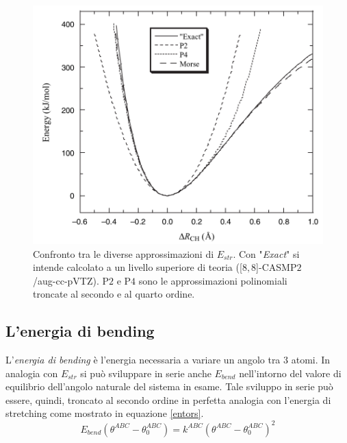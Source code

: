 \documentclass[oneside]{amsbook}
\numberwithin{section}{chapter}
\numberwithin{equation}{section}
\numberwithin{figure}{section}
\begin{document}
\begin{figure} [H]
\label{morsepot}
\centering
\caption{Confronto tra le diverse approssimazioni di $E_{str}$. Con "\emph{Exact}" si intende calcolato a un livello superiore di teoria ([$8,8$]-CASMP$2$/aug-cc-pVTZ). P$2$ e P$4$ sono le approssimazioni polinomiali troncate al secondo e al quarto ordine.}
\includegraphics[scale=0.4]{morsepot}
\end{figure}

\subsection{L'energia di bending }
L'\emph{energia di bending} è l'energia necessaria a variare un angolo tra  $3$ atomi. In analogia con $E_{str}$ si può sviluppare in serie anche $E_{bend}$ nell'intorno del valore di equilibrio dell'angolo naturale del sistema in esame. Tale sviluppo in serie può essere, quindi, troncato al secondo ordine in perfetta analogia con l'energia di stretching come mostrato in equazione \ref{entors}.
\begin{equation}
\label{entors}
E_{bend}(\theta^{ABC}-\theta^{ABC}_0)= k^{ABC} (\theta^{ABC}-\theta^{ABC}_0)^2
\end{equation}
\end{document}
